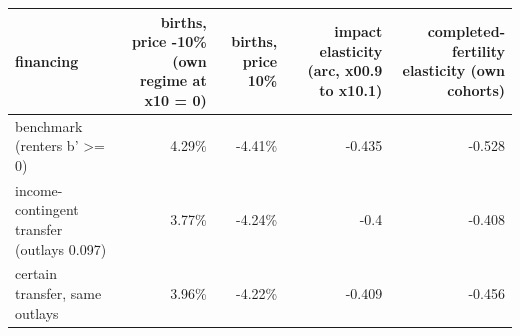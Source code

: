 \begin{tabular}{lrrrr}
\toprule
financing & births, price -10\% (own regime at x10 = 0) & births, price 10\% & impact elasticity (arc, x00.9 to x10.1) & completed-fertility elasticity (own cohorts) \\
\midrule
benchmark (renters b' >= 0) & 4.29\% & -4.41\% & -0.435 & -0.528 \\
income-contingent transfer (outlays 0.097) & 3.77\% & -4.24\% & -0.4 & -0.408 \\
certain transfer, same outlays & 3.96\% & -4.22\% & -0.409 & -0.456 \\
\bottomrule
\end{tabular}

